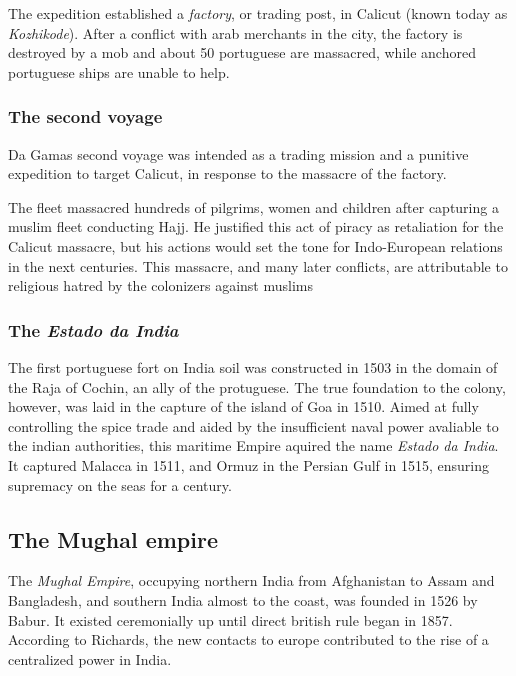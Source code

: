 \documentclass[11pt, a4paper, headings=standardclasses]{scrartcl}
\begin{document}
The expedition established a \emph{factory}, or trading post, in Calicut (known today as \textit{Kozhikode}). After a conflict with arab merchants in the city, the factory is destroyed by a mob and  about 50 portuguese are massacred, while anchored portuguese ships are unable to help.\autocite{1550}

\subsubsection{The second voyage}

Da Gamas second voyage was intended as a trading mission and a punitive expedition to target Calicut, in response to the massacre of the factory.\autocite{Vasco}

The fleet massacred hundreds of pilgrims, women and children after capturing a muslim fleet conducting Hajj. He justified this act of piracy as retaliation for the Calicut massacre,\autocite{1550} but his actions would set the tone for Indo-European relations in the next centuries. This massacre, and many later conflicts, are attributable to religious hatred by the colonizers against muslims\autocite[382]{FT}

\subsubsection{The \textit{Estado da India}}

The first portuguese fort on India soil was constructed in 1503 in the domain of the Raja of Cochin, an ally of the protuguese.\autocite[383]{FT} The true foundation to the colony, however, was laid in the capture of the island of Goa in 1510. Aimed at fully controlling the spice trade and aided by the insufficient naval power avaliable to the indian authorities, this maritime Empire aquired the name \textit{Estado da India}. It captured Malacca in 1511, and Ormuz in the Persian Gulf in 1515, ensuring supremacy on the seas for a century.\autocite[382--383]{FT}

\subsection{The Mughal empire}

The \emph{Mughal Empire}, occupying northern India from Afghanistan to Assam and Bangladesh, and southern India almost to the coast, was founded in 1526 by Babur. It existed ceremonially up until direct british rule began in 1857.
According to Richards, the new contacts to europe contributed to the rise of a centralized power in India.\autocite[6]{richards}
\end{document}
